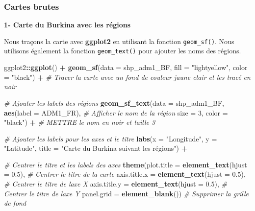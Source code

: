\documentclass[
]{article}
\newenvironment{Shaded}{\begin{snugshade}}{\end{snugshade}}
\newcommand{\AttributeTok}[1]{\textcolor[rgb]{0.13,0.29,0.53}{#1}}
\newcommand{\CommentTok}[1]{\textcolor[rgb]{0.56,0.35,0.01}{\textit{#1}}}
\newcommand{\DecValTok}[1]{\textcolor[rgb]{0.00,0.00,0.81}{#1}}
\newcommand{\FloatTok}[1]{\textcolor[rgb]{0.00,0.00,0.81}{#1}}
\newcommand{\FunctionTok}[1]{\textcolor[rgb]{0.13,0.29,0.53}{\textbf{#1}}}
\newcommand{\NormalTok}[1]{#1}
\newcommand{\SpecialCharTok}[1]{\textcolor[rgb]{0.81,0.36,0.00}{\textbf{#1}}}
\newcommand{\StringTok}[1]{\textcolor[rgb]{0.31,0.60,0.02}{#1}}
\begin{document}
\subsubsection{Cartes brutes}\label{cartes-brutes}

\textbf{1- Carte du Burkina avec les régions}

Nous traçons la carte avec \textbf{ggplot2} en utilisant la fonction
\texttt{geom\_sf()}. Nous utilisons également la fonction
\texttt{geom\_text()} pour ajouter les noms des régions.

\begin{Shaded}
\begin{Highlighting}[]
\NormalTok{ggplot2}\SpecialCharTok{::}\FunctionTok{ggplot}\NormalTok{() }\SpecialCharTok{+} 
  \FunctionTok{geom\_sf}\NormalTok{(}\AttributeTok{data =}\NormalTok{ shp\_adm1\_BF, }\AttributeTok{fill =} \StringTok{"lightyellow"}\NormalTok{, }\AttributeTok{color =} \StringTok{"black"}\NormalTok{) }\SpecialCharTok{+} \CommentTok{\# Tracer la carte avec un fond de couleur jaune clair et les tracé en noir}
  
  \CommentTok{\# Ajouter les labels des régions}
  \FunctionTok{geom\_sf\_text}\NormalTok{(}\AttributeTok{data =}\NormalTok{ shp\_adm1\_BF, }
               \FunctionTok{aes}\NormalTok{(}\AttributeTok{label =}\NormalTok{ ADM1\_FR), }\CommentTok{\# Afficher le nom de la région }
               \AttributeTok{size =} \DecValTok{3}\NormalTok{, }\AttributeTok{color =} \StringTok{"black"}\NormalTok{) }\SpecialCharTok{+}  \CommentTok{\# METTRE le nom en noir et taille 3}
  
  \CommentTok{\# Ajouter les labels pour les axes et le titre}
  \FunctionTok{labs}\NormalTok{(}\AttributeTok{x =} \StringTok{"Longitude"}\NormalTok{, }\AttributeTok{y =} \StringTok{"Latitude"}\NormalTok{, }\AttributeTok{title =} \StringTok{"Carte du Burkina suivant les régions"}\NormalTok{) }\SpecialCharTok{+}  
  
  \CommentTok{\# Centrer le titre et les labels des axes}
  \FunctionTok{theme}\NormalTok{(}\AttributeTok{plot.title =} \FunctionTok{element\_text}\NormalTok{(}\AttributeTok{hjust =} \FloatTok{0.5}\NormalTok{),  }\CommentTok{\# Centrer le titre de la carte}
        \AttributeTok{axis.title.x =} \FunctionTok{element\_text}\NormalTok{(}\AttributeTok{hjust =} \FloatTok{0.5}\NormalTok{),  }\CommentTok{\# Centrer le titre de l\textquotesingle{}axe X}
        \AttributeTok{axis.title.y =} \FunctionTok{element\_text}\NormalTok{(}\AttributeTok{hjust =} \FloatTok{0.5}\NormalTok{),  }\CommentTok{\# Centrer le titre de l\textquotesingle{}axe Y}
        \AttributeTok{panel.grid =} \FunctionTok{element\_blank}\NormalTok{())  }\CommentTok{\# Supprimer la grille de fond}
\end{Highlighting}
\end{Shaded}
\end{document}
